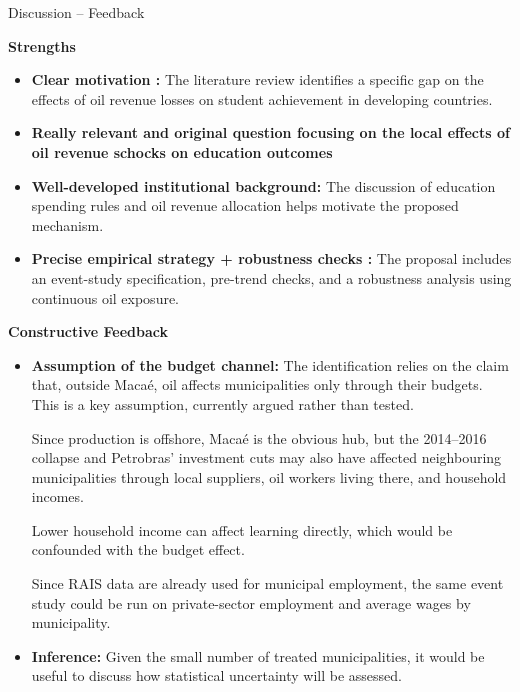 \documentclass[10pt,aspectratio=169]{beamer}
\begin{document}
\begin{frame}{Discussion -- Feedback}
\footnotesize

\textbf{Strengths}

\begin{itemize}

    \item \textbf{Clear motivation :}
    The literature review identifies a specific gap
    on the effects of oil revenue losses on student
    achievement in developing countries.

    \item \textbf{Really relevant and original question focusing on the local effects of oil revenue schocks on education outcomes}

    \vspace{0.12cm}

    \item \textbf{Well-developed institutional background:}
    The discussion of education spending rules
    and oil revenue allocation helps motivate
    the proposed mechanism.

    \vspace{0.12cm}

    \item \textbf{Precise empirical strategy + robustness checks :}
    The proposal includes an event-study specification,
    pre-trend checks, and a robustness analysis
    using continuous oil exposure.

\end{itemize}

\vspace{0.15cm}

\textbf{Constructive Feedback}

\begin{itemize}

    \item \textbf{Assumption of the budget channel:}
    The identification relies on the claim that,
    outside Macaé, oil affects municipalities only
    through their budgets. This is a key assumption,
    currently argued rather than tested.

    Since production is offshore, Macaé is the obvious
    hub, but the 2014--2016 collapse and Petrobras'
    investment cuts may also have affected neighbouring
    municipalities through local suppliers, oil workers
    living there, and household incomes.

    Lower household income can affect learning directly,
    which would be confounded with the budget effect.

    Since RAIS data are already used for municipal
    employment, the same event study could be run on
    private-sector employment and average wages
    by municipality.

    \vspace{0.12cm}

    \item \textbf{Inference:}
    Given the small number of treated municipalities,
    it would be useful to discuss how statistical
    uncertainty will be assessed.

\end{itemize}

\end{frame}
\end{document}
